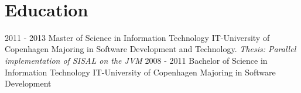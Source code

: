 \documentclass[]{friggeri-cv}
\begin{document}
\begin{entrylist}

\end{entrylist}
\\
\section{Education}
\begin{entrylist}
  \entry
    {2011 - 2013}
    {Master of Science in Information Technology}
    {IT-University of Copenhagen}
    {Majoring in Software Development and Technology.\newline
    {\textit{Thesis: Parallel implementation of SISAL on the JVM}}
    }
  \entry
    {2008 - 2011}
    {Bachelor of Science in Information Technology}
    {IT-University of Copenhagen}
    {Majoring in Software Development}
\end{entrylist}
\end{document}

